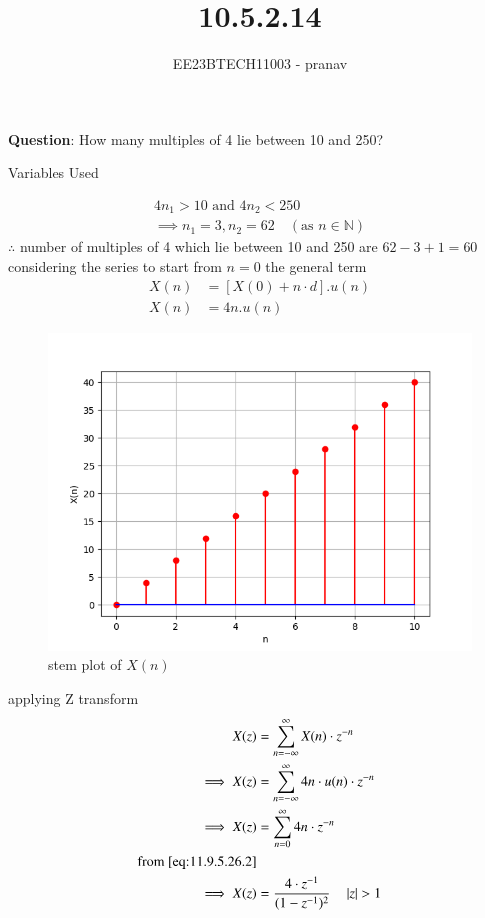 \documentclass[journal,12pt,twocolumn]{IEEEtran}
\theoremstyle{remark}
\begin{document}

\vspace{3cm}

\title{10.5.2.14}
\author{EE23BTECH11003 - pranav}
\maketitle
\newpage

\bigskip
\renewcommand{\thefigure}{\arabic{figure}}
\renewcommand{\thetable}{\arabic{table}}

\textbf{Question}:
How many multiples of 4 lie between 10 and 250?\\
\solution
\begin{table}[h]
    \centering
    
    \caption{Variables Used}
    \label{tab:table_11.9.3.6}
\end{table}
\begin{align}
     4n_{1}>10   \text{ and }  4n_{2}<250  \\
\implies n_{1}=3,n_{2}=62  \quad (\text{as }  n \in \mathbb{N})
\end{align}
 $\therefore$ number of multiples of 4 which lie between  10 and 250 are $62-3+1=60$ \\
considering the series to start from $n=0$ the general term
\begin{align}
X(n)&=[X(0)+n\cdot d].u(n)\\
X(n)&=4n.u(n)
\end{align}
\begin{figure}[h!]
    \centering
    \includegraphics[width=1.1\linewidth]{figs/graph1.png}
    \caption{stem plot of $X(n)$}
\end{figure}

applying Z transform
\begin{align}
    X(z)&= \sum_{n=-\infty}^{\infty}X(n)\cdot z^{-n}\\
   \implies X(z)&= \sum_{n=-\infty}^{\infty} 4n\cdot u(n)\cdot z^{-n}\\
   \implies X(z) &=\sum_{n= 0}^{\infty} 4n \cdot z^{-n}\\
   \text{from } \ref{eq:11.9.5.26.2}\\
   \implies X(z)&=\frac{4\cdot z^{-1}}{(1-z^{-1})^{2}}\quad \left\vert z\right\vert>1
\end{align}
\end{document}
